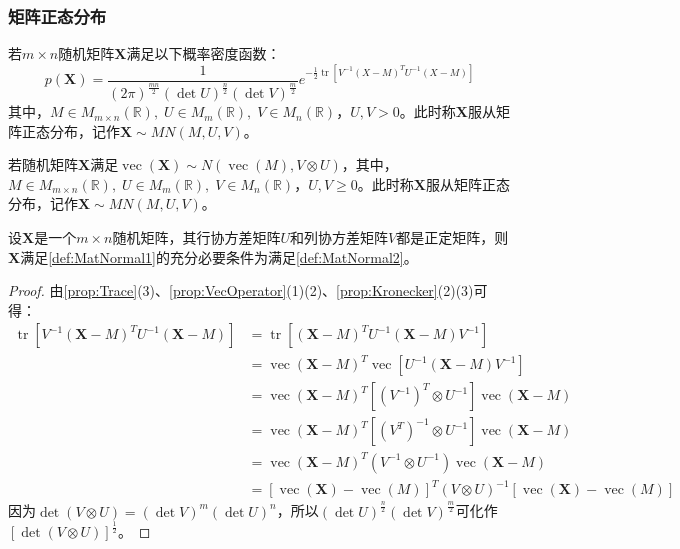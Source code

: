 \subsubsection{矩阵正态分布}
\begin{definition}\label{def:MatNormal1}
	若$m\times n$随机矩阵$\mathbf{X}$满足以下概率密度函数：
	\begin{equation*}
		p(\mathbf{X})=\frac{1}{(2\pi)^{\frac{mn}{2}}(\det U)^{\frac{n}{2}}(\det V)^{\frac{m}{2}}}e^{-\frac{1}{2}\operatorname{tr}[V^{-1}(X-M)^TU^{-1}(X-M)]}
	\end{equation*}
	其中，$M\in M_{m\times n}(\mathbb{R}),\;U\in M_{m}(\mathbb{R}),\;V\in M_{n}(\mathbb{R})$，$U,V>0$。此时称$\mathbf{X}$服从矩阵正态分布，记作$\mathbf{X}\sim MN(M,U,V)$。
\end{definition}
\begin{definition}\label{def:MatNormal2}
	若随机矩阵$\mathbf{X}$满足$\operatorname{vec}(\mathbf{X})\sim N(\operatorname{vec}(M),V\otimes U)$，其中，$M\in M_{m\times n}(\mathbb{R}),\;U\in M_{m}(\mathbb{R}),\;V\in M_{n}(\mathbb{R})$，$U,V\geqslant0$。此时称$\mathbf{X}$服从矩阵正态分布，记作$\mathbf{X}\sim MN(M,U,V)$。
\end{definition}
\begin{theorem}
	设$\mathbf{X}$是一个$m\times n$随机矩阵，其行协方差矩阵$U$和列协方差矩阵$V$都是正定矩阵，则$\mathbf{X}$满足\cref{def:MatNormal1}的充分必要条件为满足\cref{def:MatNormal2}。
\end{theorem}
\begin{proof}
	由\cref{prop:Trace}(3)、\cref{prop:VecOperator}(1)(2)、\cref{prop:Kronecker}(2)(3)可得：
	\begin{align*}
		\operatorname{tr}[V^{-1}(\mathbf{X}-M)^TU^{-1}(\mathbf{X}-M)]
		&=\operatorname{tr}[(\mathbf{X}-M)^TU^{-1}(\mathbf{X}-M)V^{-1}] \\
		&=\operatorname{vec}(\mathbf{X}-M)^T\operatorname{vec}[U^{-1}(\mathbf{X}-M)V^{-1}] \\
		&=\operatorname{vec}(\mathbf{X}-M)^T[(V^{-1})^T\otimes U^{-1}]\operatorname{vec}(\mathbf{X}-M) \\
		&=\operatorname{vec}(\mathbf{X}-M)^T[(V^T)^{-1}\otimes U^{-1}]\operatorname{vec}(\mathbf{X}-M) \\
		&=\operatorname{vec}(\mathbf{X}-M)^T(V^{-1}\otimes U^{-1})\operatorname{vec}(\mathbf{X}-M) \\
		&=[\operatorname{vec}(\mathbf{X})-\operatorname{vec}(M)]^T(V\otimes U)^{-1}[\operatorname{vec}(\mathbf{X})-\operatorname{vec}(M)]
	\end{align*}
	因为$\det(V\otimes U)=(\det V)^m(\det U)^n$，所以$(\det U)^{\frac{n}{2}}(\det V)^{\frac{m}{2}}$可化作$[\det(V\otimes U)]^{\frac{1}{2}}$。
\end{proof}
